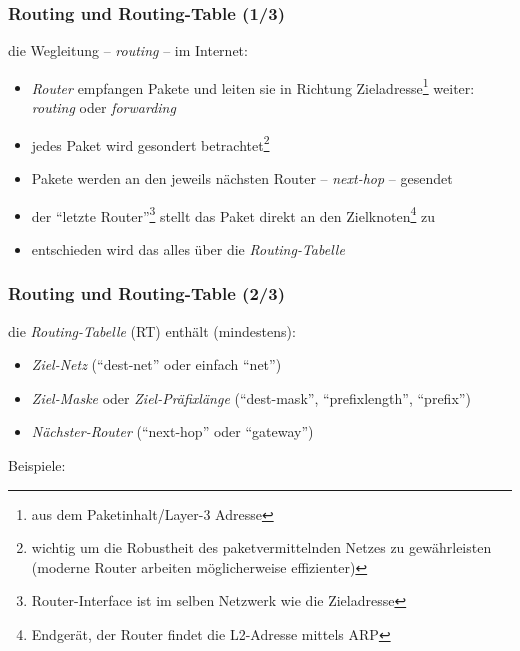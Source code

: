 \documentclass{beamer}
\begin{document}
\begin{frame}
\frametitle{Routing und Routing-Table (1/3)}
die Wegleitung -- {\em routing} -- im Internet:
	\begin{itemize}
	\item{{\em Router} empfangen Pakete und leiten sie in Richtung Zieladresse\footnote{aus dem Paketinhalt/Layer-3 Adresse} weiter: {\em routing} oder {\em forwarding}}
	\item{jedes Paket wird gesondert betrachtet\footnote{wichtig um die Robustheit des paketvermittelnden Netzes zu gew\"ahrleisten (moderne Router arbeiten m\"oglicherweise effizienter)}}
	\item{Pakete werden an den jeweils n\"achsten Router -- {\em next-hop} -- gesendet}
	\item{der ``letzte Router''\footnote{Router-Interface ist im selben Netzwerk wie die Zieladresse} stellt das Paket direkt an den Zielknoten\footnote{Endger\"at, der Router findet die L2-Adresse mittels ARP} zu}
	\item{entschieden wird das alles \"uber die {\em Routing-Tabelle}}
\end{itemize}
\end{frame}

\begin{frame}
\frametitle{Routing und Routing-Table (2/3)}
die {\em Routing-Tabelle} (RT) enth\"alt (mindestens):
\begin{itemize}
	\item{{\em Ziel-Netz} {\small (``dest-net'' oder einfach ``net'')}}
	\item{{\em Ziel-Maske} oder {\em Ziel-Pr\"afixl\"ange} {\small (``dest-mask'', ``prefixlength'', ``prefix'')}}
	\item{{\em N\"achster-Router} {\small (``next-hop'' oder ``gateway'')}}
\end{itemize}
\begin{tiny}
Beispiele:

\end{tiny}
\end{frame}
\end{document}
